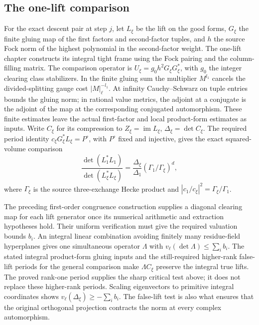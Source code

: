 \subsection{The one-lift comparison}
For the exact descent pair at step \(j\), let \(L_\xi\) be the
lift on the good forms, \(G_\xi\) the finite gluing map of the
first factors and second-factor tuples, and \(h\) the source
Fock norm of the highest polynomial in the second-factor weight.
The 
{one-lift chapter} constructs its integral tight frame
using the Fock pairing and the column-filling matrix.
The comparison operator is
\(U_\xi=g_0 h^2G_\xi G_\xi^*\), with \(g_0\) the integer
clearing class stabilizers. In the finite gluing sum the
multiplier \(M^{l_1}\) cancels the divided-splitting gauge
cost \(|M|_\ell^{-l_1}\). At infinity Cauchy--Schwarz
on tuple entries bounds the gluing norm; in rational value
metrics, the adjoint at a conjugate is the adjoint of the
map at the corresponding conjugated automorphism. These
finite estimates leave the actual first-factor and local
product-form estimates as inputs. Write \(C_\xi\) for its compression
to \(Z_\xi=\operatorname{im} L_\xi\), \(\Delta_\xi=\det C_\xi\).
The required period identity
\(c_\xi G_\xi^*L_\xi=P^\circ\), with \(P^\circ\) fixed
and injective, gives the exact squared-volume comparison
\[
 \frac{\det(L_1^*L_1)}{\det(L_\xi^*L_\xi)}
   =\frac{\Delta_\xi}{\Delta_1}
     (\Gamma_1/\Gamma_\xi)^d,
\]
where \(\Gamma_\xi\) is the source three-exchange Hecke
product and \(|c_1/c_\xi|^2=\Gamma_\xi/\Gamma_1\).

The preceding first-order congruence construction supplies a
diagonal clearing map for each lift generator once its numerical
arithmetic and extraction hypotheses hold. Their uniform verification
must give the required valuation bounds \(b_i\). An integral linear combination
avoiding finitely many residue-field hyperplanes gives one
simultaneous operator \(\Lambda\) with
\(v_\ell(\det\Lambda)\le\sum_i b_i\).
The stated integral product-form gluing inputs and the still-required
higher-rank false-lift periods for the general comparison make
\(\Lambda C_\xi\) preserve the integral true lifts. The proved
rank-one period supplies the sharp critical test above; it does not
replace these higher-rank periods. Scaling eigenvectors to primitive integral
coordinates shows \(v_\ell(\Delta_\xi)\ge-\sum_i b_i\).
The false-lift test is also what ensures that the original
orthogonal projection contracts the norm at every complex
automorphism.

